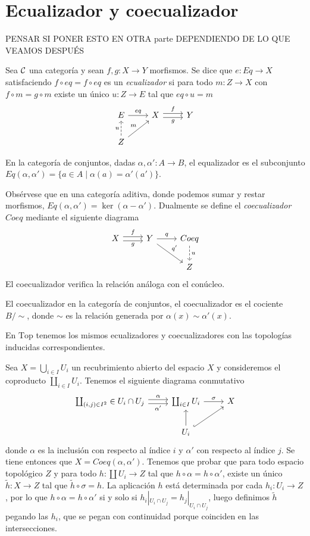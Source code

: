 \documentclass[GA.tex]{subfiles}
\begin{document}
\section{Ecualizador y coecualizador}
PENSAR SI PONER ESTO EN OTRA parte DEPENDIENDO DE LO QUE VEAMOS DESPUÉS

Sea $\mathcal{C}$ una categoría y sean $f,g:X\to Y$ morfismos. Se dice que $e:Eq\to X$ satisfaciendo $f\circ eq= f\circ eq$ es un \emph{ecualizador} si para todo $m:Z\to X$ con $f \circ m=g\circ m$ existe un único $u:Z\to E$ tal que $eq\circ u=m$
\[
\begin{tikzcd}
E\arrow[r, "eq"] & X\arrow[r, shift left, "f"]\arrow[r, shift right, "g"'] & Y\\
Z\arrow[u, dashed, "u"]\arrow[ur, "m"] & 
\end{tikzcd}
\] 

\begin{ej}
En la categoría de conjuntos, dadas $\alpha, \alpha': A\to B$, el equalizador es el subconjunto $Eq(\alpha,\alpha')=\{a\in A\mid \alpha(a)=\alpha'(a')\}$. 
\end{ej}
Obsérvese que en una categoría aditiva, donde podemos sumar y restar morfismos, $Eq(\alpha,\alpha')=\ker(\alpha-\alpha')$. Dualmente se define el \emph{coecualizador} $Coeq$ mediante el siguiente diagrama
\[
\begin{tikzcd}
X\arrow[r, shift left, "f"]\arrow[r, shift right, "g"'] & Y\arrow[r, "q"] \arrow[dr, "q'"]& Coeq\arrow[d,dashed, "u"]\\
& & Z
\end{tikzcd}
\]
El coecualizador verifica la relación análoga con el conúcleo.
\begin{ej}
El coecualizador en la categoría de conjuntos, el coecualizador es el cociente $B/\sim$, donde $\sim$ es la relación generada por $\alpha(x)\sim\alpha'(x)$. 
\end{ej}
\begin{ej}
En $\mathrm{Top}$ tenemos los mismos ecualizadores y coecualizadores con las topologías inducidas correspondientes. 
\end{ej}

Sea $X=\bigcup_{i\in I}U_i$ un recubrimiento abierto del espacio $X$ y consideremos el coproducto $\coprod_{i\in I}U_i$. Tenemos el siguiente diagrama conmutativo 
\[
\begin{tikzcd}
\coprod_{(i,j)\in I^2}\in U_i\cap U_j\arrow[r, shift left, "\alpha"]\arrow[r, shift right,"\alpha'"']&\coprod_{i\in I}U_i\arrow[r, "\sigma"] & X\\
&U_i\arrow[u]\arrow[ur,hookrightarrow]&
\end{tikzcd}
\]
donde $\alpha$ es la inclusión con respecto al índice $i$ y $\alpha'$ con respecto al índice $j$. Se tiene entonces que $X=Coeq(\alpha,\alpha')$. Tenemos que probar que para todo espacio topológico $Z$ y para todo $h:\coprod U_i\to Z$ tal que $h\circ\alpha=h\circ\alpha'$, existe un único $\tilde{h}: X\to Z$ tal que $\tilde{h}\circ\sigma=h$. La aplicación $h$ está determinada por cada $h_i:U_i\to Z$, por lo que $h\circ \alpha=h\circ\alpha'$ si y solo si $h_i|_{U_i\cap U_j}=h_j|_{U_i\cap U_j}$, luego definimos $\tilde{h}$ pegando las $h_i$, que se pegan con continuidad porque coinciden en las intersecciones.
\end{document}

